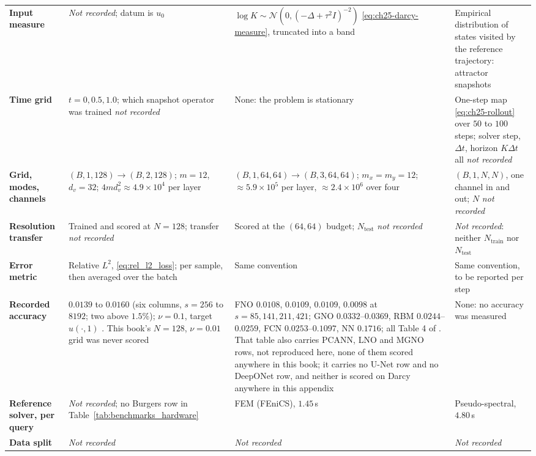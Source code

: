 \begin{table}[p]
\begin{tabularx}{\textwidth}{@{}>{\raggedright\arraybackslash}p{2.45cm}%
  >{\raggedright\arraybackslash}X >{\raggedright\arraybackslash}X
  >{\raggedright\arraybackslash}X@{}}
\textbf{Input measure}
& \emph{Not recorded}; datum is $u_0$
& $\log K \sim \mathcal{N}(0, (-\Delta + \tau^{2} I)^{-2})$ \eqref{eq:ch25-darcy-measure}, truncated into a band
& Empirical distribution of states visited by the reference trajectory: attractor snapshots \\
\textbf{Time grid}
& $t = 0, 0.5, 1.0$; which snapshot operator was trained \emph{not recorded}
& None: the problem is stationary
& One-step map \eqref{eq:ch25-rollout} over $50$ to $100$ steps; solver step, $\Delta t$, horizon $K\Delta t$ all \emph{not recorded} \\
\textbf{Grid, modes, channels}
& $(B,1,128) \to (B,2,128)$; $m = 12$, $d_v = 32$; $4md_v^{2} \approx 4.9\times10^{4}$ per layer
& $(B,1,64,64) \to (B,3,64,64)$; $m_x = m_y = 12$; $\approx 5.9\times10^{5}$ per layer, $\approx 2.4\times10^{6}$ over four
& $(B,1,N,N)$, one channel in and out; $N$ \emph{not recorded} \\
\textbf{Resolution transfer}
& Trained and scored at $N = 128$; transfer \emph{not recorded}
& Scored at the $(64,64)$ budget; $N_{\text{test}}$ \emph{not recorded}
& \emph{Not recorded}: neither $N_{\text{train}}$ nor $N_{\text{test}}$ \\
\textbf{Error metric}
& Relative $L^{2}$, \eqref{eq:rel_l2_loss}; per sample, then averaged over the batch
& Same convention
& Same convention, to be reported per step \\
\textbf{Recorded accuracy}
& $0.0139$ to $0.0160$ (six columns, $s = 256$ to $8192$; two above $1.5\%$);
$\nu = 0.1$, target
$u(\cdot, 1)$ \cite{li2021fourier}. This book's $N = 128$, $\nu = 0.01$ grid was never scored
& FNO $0.0108$, $0.0109$, $0.0109$, $0.0098$ at $s = 85, 141, 211, 421$; GNO
$0.0332$--$0.0369$, RBM $0.0244$--$0.0259$, FCN $0.0253$--$0.1097$, NN $0.1716$; all
Table 4 of \cite{li2021fourier}. That table also carries PCANN, LNO and MGNO rows,
not reproduced here, none of them scored anywhere in this book; it carries no U-Net row
and no DeepONet row,
and neither is scored on Darcy anywhere in this appendix
& None: no accuracy was measured \\
\textbf{Reference solver, per query}
& \emph{Not recorded}; no Burgers row in Table~\ref{tab:benchmarks_hardware}
& FEM (FEniCS), $1.45$\,s
& Pseudo-spectral, $4.80$\,s \\
\textbf{Data split}
& \emph{Not recorded}
& \emph{Not recorded}
& \emph{Not recorded} \\
\bottomrule
\end{tabularx}
\end{table}

